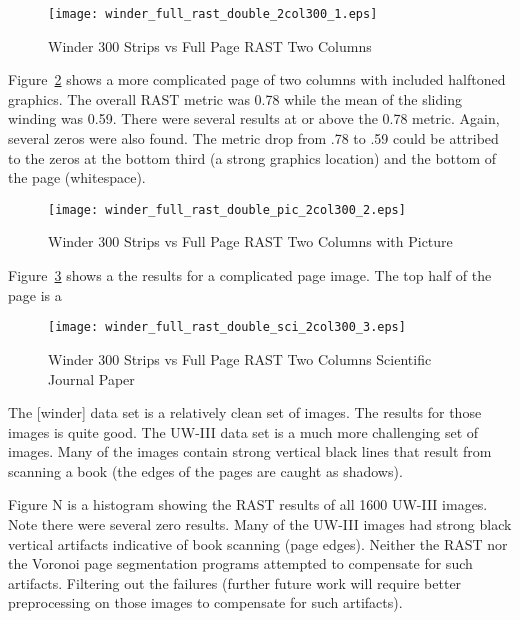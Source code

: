 \documentclass[conference]{IEEEtran}
\begin{document}
\begin{figure}[winder-300-double-2col300]
\texttt{[image: winder\_full\_rast\_double\_2col300\_1.eps]}
\caption{Winder 300 Strips vs Full Page RAST Two Columns}
\label{fig:winder-300-double-2col300}
\end{figure}

Figure~\ref{fig:winder-300-double-pic-2col300} shows a more complicated page of
two columns with included halftoned graphics. The overall RAST metric was 0.78
while the mean of the sliding winding was 0.59. There were several results at
or above the 0.78 metric. Again, several zeros were also found. The metric drop
from .78 to .59 could be attribed to the zeros at the bottom third (a strong
graphics location) and the bottom of the page (whitespace).

\begin{figure}[winder-300-double-pic-2col300]
\texttt{[image: winder\_full\_rast\_double\_pic\_2col300\_2.eps]}
\caption{Winder 300 Strips vs Full Page RAST Two Columns with Picture}
\label{fig:winder-300-double-pic-2col300}
\end{figure}

Figure~\ref{fig:winder-300-double-pic-sci-2col300} shows a the results for a
complicated page image. The top half of the page is a 

\begin{figure}[winder-300-double-pic-sci-2col300]
\texttt{[image: winder\_full\_rast\_double\_sci\_2col300\_3.eps]}
\caption{Winder 300 Strips vs Full Page RAST Two Columns Scientific Journal Paper}
\label{fig:winder-300-double-pic-sci-2col300}
\end{figure}


The [winder] data set is a relatively clean set of images. The results for
those images is quite good. The UW-III data set is a much more challenging set
of images. Many of the images contain strong vertical black lines that result
from scanning a book (the edges of the pages are caught as shadows). 

Figure N is a histogram showing the RAST results of all 1600 UW-III images.
Note there were several zero results. Many of the UW-III images had strong
black vertical artifacts indicative of book scanning (page edges). Neither the
RAST nor the Voronoi page segmentation programs attempted to compensate for
such artifacts. Filtering out the failures (further future work will require
better preprocessing on those images to compensate for such artifacts). 
\end{document}
